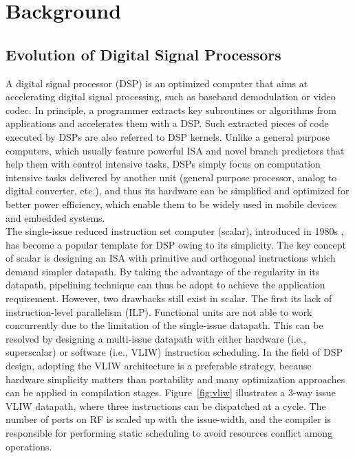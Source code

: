 \chapter{Background}
    \section{Evolution of Digital Signal Processors}
        A digital signal processor (DSP) is an optimized computer that aims at accelerating digital signal processing, such as baseband demodulation or video codec.
        In principle, a programmer extracts key subroutines or algorithms from applications and accelerates them with a DSP.
        Such extracted pieces of code executed by DSPs are also referred to DSP kernels.
        Unlike a general purpose computers, which usually feature powerful ISA and novel branch predictors that help them with control intensive tasks,
        DSPs simply focus on computation intensive tasks delivered by another unit (general purpose processor, analog to digital converter, etc.), 
        and thus its hardware can be simplified and optimized for better power efficiency, which enable them to be widely used in mobile devices and embedded systems.
        \\\indent
        The single-issue reduced instruction set computer (scalar), introduced in 1980s \cite{risc}, has become a popular template for DSP owing to its simplicity.
        The key concept of scalar is designing an ISA with primitive and orthogonal instructions which demand simpler datapath.
        By taking the advantage of the regularity in its datapath, pipelining technique can thus be adopt to achieve the application requirement.
        However, two drawbacks still exist in scalar. 
        The first its lack of instruction-level parallelism (ILP). 
        Functional units are not able to work concurrently due to the limitation of the single-issue datapath.
        This can be resolved by designing a multi-issue datapath with either hardware (i.e., superscalar) or software (i.e., VLIW) instruction scheduling.
        In the field of DSP design, adopting the VLIW architecture is a preferable strategy, 
        because hardware simplicity matters than portability and many optimization approaches can be applied in compilation stages. 
        Figure~\ref{fig:vliw} illustrates a 3-way issue VLIW datapath, where three instructions can be dispatched at a cycle.
        The number of ports on RF is scaled up with the issue-width, and the compiler is responsible for performing static scheduling to avoid resources conflict among operations.
